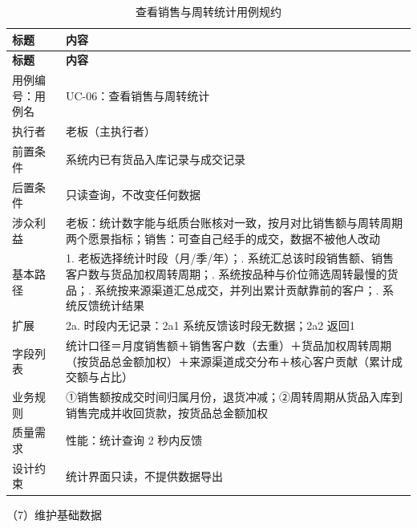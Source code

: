 {\small
\begin{longtable}{@{}L{3.0cm} L{12.3cm}@{}}
\caption{查看销售与周转统计用例规约}\label{tab:uc-06}\\
\toprule
\textbf{标题} & \textbf{内容} \\
\midrule
\endfirsthead
\toprule
\textbf{标题} & \textbf{内容} \\
\midrule
\endhead
用例编号：用例名 & UC-06：查看销售与周转统计 \\
\midrule
执行者 & 老板（主执行者） \\
\midrule
前置条件 & 系统内已有货品入库记录与成交记录 \\
\midrule
后置条件 & 只读查询，不改变任何数据 \\
\midrule
涉众利益 & 老板：统计数字能与纸质台账核对一致，按月对比销售额与周转周期两个愿景指标；\newline 销售：可查自己经手的成交，数据不被他人改动 \\
\midrule
基本路径 & 1. 老板选择统计时段（月/季/年）；. 系统汇总该时段销售额、销售客户数与货品加权周转周期；. 系统按品种与价位筛选周转最慢的货品；. 系统按来源渠道汇总成交，并列出累计贡献靠前的客户；. 系统反馈统计结果 \\
\midrule
扩展 & 2a. 时段内无记录：2a1 系统反馈该时段无数据；2a2 返回1 \\
\midrule
字段列表 & 统计口径＝月度销售额＋销售客户数（去重）＋货品加权周转周期（按货品总金额加权）＋来源渠道成交分布＋核心客户贡献（累计成交额与占比） \\
\midrule
业务规则 & ①销售额按成交时间归属月份，退货冲减；\newline ②周转周期从货品入库到销售完成并收回货款，按货品总金额加权 \\
\midrule
质量需求 & 性能：统计查询 2 秒内反馈 \\
\midrule
设计约束 & 统计界面只读，不提供数据导出 \\
\midrule
\bottomrule
\end{longtable}}
\noindent（7）维护基础数据

